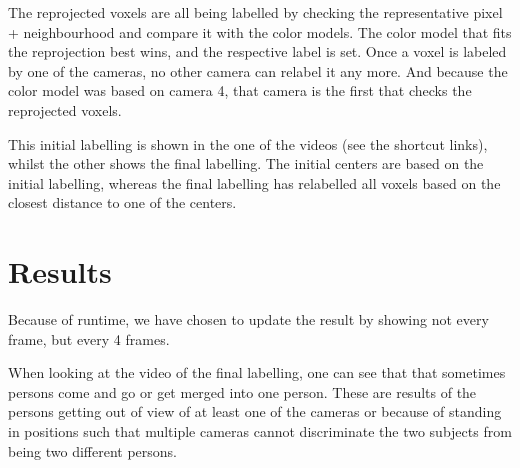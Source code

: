 \documentclass[paper=a4, fontsize=11pt]{scrartcl} %
\numberwithin{equation}{section} %
\numberwithin{figure}{section} %
\numberwithin{table}{section} %
\begin{document}
The reprojected voxels are all being labelled by checking the representative pixel + neighbourhood and compare it with the color models. The color model that fits the reprojection best wins, and the respective label is set. Once a voxel is labeled by one of the cameras, no other camera can relabel it any more. And because the color model was based on camera 4, that camera is the first that checks the reprojected voxels.

This initial labelling is shown in the one of the videos (see the shortcut links), whilst the other shows the final labelling. The initial centers are based on the initial labelling, whereas the final labelling has relabelled all voxels based on the closest distance to one of the centers.

\section{Results}
Because of runtime, we have chosen to update the result by showing not every frame, but every 4 frames. 

When looking at the video of the final labelling, one can see that that sometimes persons come and go or get merged into one person. These are results of the persons getting out of view of at least one of the cameras or because of standing in positions such that multiple cameras cannot discriminate the two subjects from being two different persons.
\end{document}
